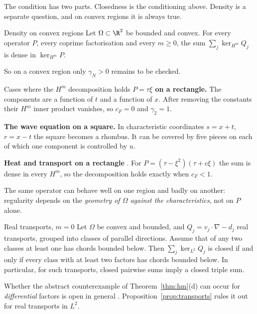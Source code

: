 The condition has two parts. Closedness is the conditioning above. Density is a separate question, and on convex regions it is always true.

\begin{theorem}{Density on convex regions  }\label{thm:density}
Let $\Omega\subset\R^2$ be bounded and convex. For every operator $P$, every coprime factorisation and every $m\ge0$, the sum $\sum_j\ker_{H^m}Q_j$ is dense in $\ker_{H^m}P$.

\end{theorem}

So on a convex region only $\gamma_N>0$ remains to be checked.

\begin{example}{Cases where the $H^m$ decomposition holds  \proved}
\textbf{$P=\tau\xi$ on a rectangle.} The components are a function of $t$ and a function of $x$. After removing the constants their $H^m$ inner product vanishes, so $c_F=0$ and $\gamma_2=1$.

\textbf{The wave equation on a square.} In characteristic coordinates $s=x+t$, $r=x-t$ the square becomes a rhombus. It can be covered by five pieces on each of which one component is controlled by $u$.

\textbf{Heat and transport on a rectangle}  \pw. For $P=(\tau-\xi^2)(\tau+c\xi)$ the sum is dense in every $H^m$, so the decomposition holds exactly when $c_F<1$.

The same operator can behave well on one region and badly on another: regularity depends on the \emph{geometry of $\Omega$ against the characteristics}, not on $P$ alone.

\end{example}

\begin{proposition}{Real transports, $m=0$  \pw}\label{prop:transports}
Let $\Omega$ be convex and bounded, and $Q_j=v_j\cdot\nabla-d_j$ real transports, grouped into classes of parallel directions. Assume that of any two classes at least one has chords bounded below. Then $\sum_j\ker_{L^2}Q_j$ is closed if and only if every class with at least two factors has chords bounded below. In particular, for such transports, closed pairwise sums imply a closed triple sum.

\end{proposition}

\begin{caution}[title={Three or more components: what is still open}]
Whether the abstract counterexample of Theorem~\ref{thm:hm}(d) can occur for \emph{differential} factors is open in general \openq{} . Proposition~\ref{prop:transports} rules it out for real transports in $L^2$.
\end{caution}

